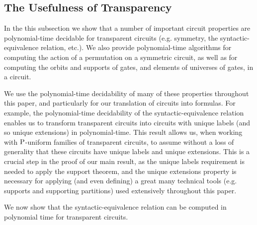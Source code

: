 \documentclass[../paper.tex]{subfiles}
\begin{document}



\subsection{The Usefulness of Transparency}
In the this subsection we show that a number of important circuit properties are
polynomial-time decidable for transparent circuits (e.g. symmetry, the
syntactic-equivalence relation, etc.). We also provide polynomial-time
algorithms for computing the action of a permutation on a symmetric circuit, as
well as for computing the orbits and supports of gates, and elements of
universes of gates, in a circuit.

We use the polynomial-time decidability of many of these properties throughout
this paper, and particularly for our translation of circuits into formulas. For
example, the polynomial-time decidability of the syntactic-equivalence relation
enables us to transform transparent circuits into circuits with unique labels
(and so unique extensions) in polynomial-time. This result allows us, when
working with $\mathrm{P}$-uniform families of transparent circuits, to assume without a
loss of generality that these circuits have unique labels and unique extensions.
This is a crucial step in the proof of our main result, as the unique labels
requirement is needed to apply the support theorem, and the unique extensions
property is necessary for applying (and even defining) a great many technical
tools (e.g. supports and supporting partitions) used extensively throughout this
paper.

We now show that the syntactic-equivalence relation can be computed in
polynomial time for transparent circuits.

\end{document}
